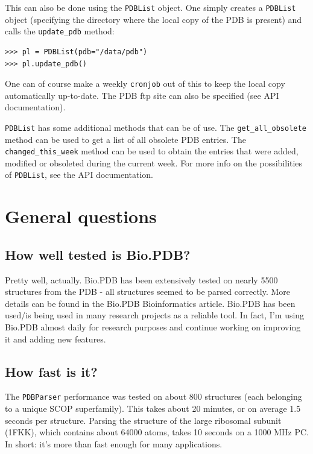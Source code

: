 This can also be done using the \texttt{PDBList} object. One simply
creates a \texttt{PDBList} object (specifying the directory where
the local copy of the PDB is present) and calls the \texttt{update\_pdb}
method:

\begin{verbatim}
>>> pl = PDBList(pdb="/data/pdb")
>>> pl.update_pdb()
\end{verbatim}
One can of course make a weekly \texttt{cronjob} out of this to keep
the local copy automatically up-to-date. The PDB ftp site can also
be specified (see API documentation).

\texttt{PDBList} has some additional methods that can be of use. The
\texttt{get\_all\_obsolete} method can be used to get a list of all
obsolete PDB entries. The \texttt{changed\_this\_week} method can
be used to obtain the entries that were added, modified or obsoleted
during the current week. For more info on the possibilities of \texttt{PDBList},
see the API documentation.

\section{General questions}

\subsection{How well tested is Bio.PDB?}

Pretty well, actually. Bio.PDB has been extensively tested on nearly
5500 structures from the PDB - all structures seemed to be parsed
correctly. More details can be found in the Bio.PDB Bioinformatics
article. Bio.PDB has been used/is being used in many research projects
as a reliable tool. In fact, I'm using Bio.PDB almost daily for research
purposes and continue working on improving it and adding new features.

\subsection{How fast is it?}

The \texttt{PDBParser} performance was tested on about 800 structures
(each belonging to a unique SCOP superfamily). This takes about 20
minutes, or on average 1.5 seconds per structure. Parsing the structure
of the large ribosomal subunit (1FKK), which contains about 64000
atoms, takes 10 seconds on a 1000 MHz PC. In short: it's more than
fast enough for many applications.

